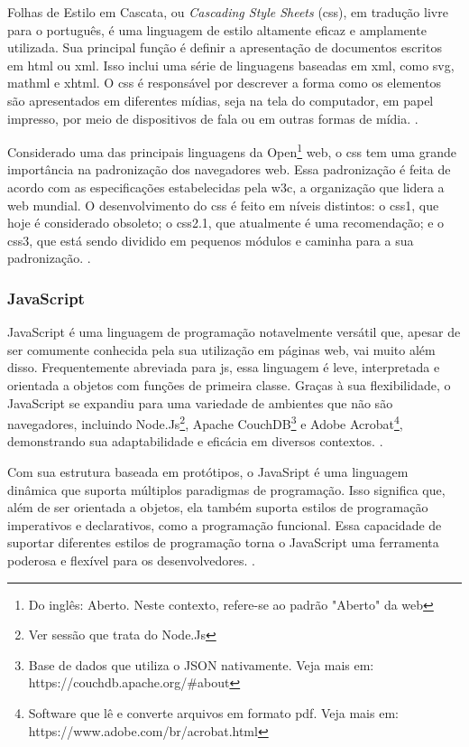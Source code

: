 Folhas de Estilo em Cascata, ou \textit{Cascading Style Sheets}
(\acrshort{css}),
em tradução livre
para o português, é uma linguagem de estilo altamente eficaz e amplamente utilizada. Sua
principal função é definir a apresentação de documentos escritos em
\acrshort{html}
ou
\acrshort{xml}.
Isso
inclui uma série de linguagens baseadas em
\acrshort{xml},
como
\acrshort{svg},
\acrshort{mathml}
e
\acrshort{xhtml}.
O
\acrshort{css}
é
responsável por descrever a forma como os elementos são apresentados em diferentes mídias,
seja na tela do computador, em papel impresso, por meio de dispositivos de fala ou em outras
formas de mídia.
\cite{mdn-css}.

Considerado uma das principais linguagens da
Open\footnote{Do inglês: Aberto. Neste contexto, refere-se ao padrão "Aberto" da
    \acrshort{web}
}
\acrshort{web},
o
\acrshort{css}
tem uma grande
importância na padronização dos navegadores
\acrshort{web}.
Essa padronização é feita de acordo com
as especificações estabelecidas pela
\acrshort{w3c},
a organização que lidera a
\acrshort{web}
mundial. O
desenvolvimento do
\acrshort{css}
é feito em níveis distintos: o
\acrshort{css}1,
que hoje é considerado
obsoleto; o
\acrshort{css}2.1,
que atualmente é uma recomendação; e o
\acrshort{css}3,
que está sendo dividido
em pequenos módulos e caminha para a sua padronização.
\cite{mdn-css}.

\subsubsection{JavaScript}

JavaScript é uma linguagem de programação notavelmente versátil que, apesar de ser
comumente conhecida pela sua utilização em páginas
\acrshort{web}, vai muito além disso.
Frequentemente abreviada para 
\acrshort{js}, essa linguagem é leve, interpretada e orientada a objetos
com funções de primeira classe. Graças à sua flexibilidade, o JavaScript se expandiu para uma
variedade de ambientes que não são navegadores, incluindo
Node.Js\footnote{Ver sessão que trata do Node.Js
},
Apache CouchDB\footnote{Base de dados que utiliza o JSON nativamente. Veja mais em: https://couchdb.apache.org/\#about
}
e
Adobe Acrobat\footnote{Software que lê e converte arquivos em formato
    \acrshort{pdf}. Veja mais em: \\ https://www.adobe.com/br/acrobat.html
},
demonstrando sua adaptabilidade e eficácia em diversos contextos.
\cite{mdn-js}.

Com sua estrutura baseada em protótipos, o JavaSript é uma linguagem dinâmica que
suporta múltiplos paradigmas de programação. Isso significa que, além de ser orientada a
objetos, ela também suporta estilos de programação imperativos e declarativos, como a
programação funcional. Essa capacidade de suportar diferentes estilos de programação torna o
JavaScript uma ferramenta poderosa e flexível para os desenvolvedores.
\cite{mdn-js}.

